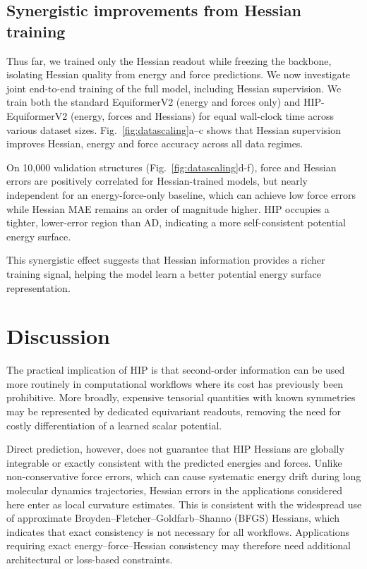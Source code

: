 \documentclass[pdflatex,sn-mathphys-num]{sn-jnl}%
\begin{document}
\subsection{Synergistic improvements from Hessian training}
Thus far, we trained only the Hessian readout while freezing the backbone, isolating Hessian quality from energy and force predictions. We now investigate joint end-to-end training of the full model, including Hessian supervision.
We train both the standard EquiformerV2 (energy and forces only) and HIP-EquiformerV2 (energy, forces and Hessians) for equal wall-clock time across various dataset sizes. Fig.~\ref{fig:datascaling}a--c shows that Hessian supervision improves Hessian, energy and force accuracy across all data regimes.

On 10{,}000 validation structures (Fig.~\ref{fig:datascaling}d-f), force and Hessian errors are positively correlated for Hessian-trained models, but nearly independent for an energy-force-only baseline, which can achieve low force errors while Hessian MAE remains an order of magnitude higher. HIP occupies a tighter, lower-error region than AD, indicating a more self-consistent potential energy surface.

This synergistic effect suggests that Hessian information provides a richer training signal, helping the model learn a better potential energy surface representation.

\section{Discussion}
The practical implication of HIP is that second-order information can be used more routinely in computational workflows where its cost has previously been prohibitive.
More broadly, expensive tensorial quantities with known symmetries may be represented by dedicated equivariant readouts, removing the need for costly differentiation of a learned scalar potential.

Direct prediction, however, does not guarantee that HIP Hessians are globally integrable or exactly consistent with the predicted energies and forces. Unlike non-conservative force errors, which can cause systematic energy drift during long molecular dynamics trajectories, Hessian errors in the applications considered here enter as local curvature estimates. This is consistent with the widespread use of approximate Broyden--Fletcher--Goldfarb--Shanno (BFGS) Hessians, which indicates that exact consistency is not necessary for all workflows. Applications requiring exact energy--force--Hessian consistency may therefore need additional architectural or loss-based constraints.
\end{document}
